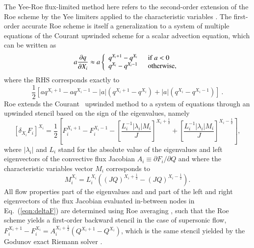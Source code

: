 The Yee-Roe flux-limited method here refers to the second-order extension
of the Roe scheme \cite{jcp:1981:roe} by
the Yee limiters applied to the characteristic variables \cite{jcp:1990:yee}.
The first-order accurate Roe scheme is itself a generalization to
a system of multiple equations of
the Courant upwinded scheme \cite{misc:1952:courant} for a scalar advection equation,
which can be written as
%
\begin{equation}
  a\frac{\partial q}{\partial X_i} \approx
  a \left\{
    \begin{array}{ll} q^{X_i+1}-q^{X_i} & ~~{\rm if}~a<0 \\
                      q^{X_i}-q^{X_i-1} & ~~{\rm otherwise,}\end{array}
\right.
\end{equation}
%
where the RHS corresponds exactly to
%
\begin{equation}
  \frac{1}{2} \left[
                         a q^{X_i+1}- a q^{X_i-1}
                       - |a| \left( q^{X_i+1} - q^{X_i} \right)
                       + |a| \left( q^{X_i} - q^{X_i-1} \right) \right]~.
\end{equation}
%
Roe extends the Courant \etal\ upwinded method to a system of equations through
an upwinded stencil based on the sign of the eigenvalues, namely
%
\begin{equation}
\left[ \delta_{X_i} F_i \right]^{X_i}=\frac{1}{2}\left[ F_{i}^{X_i+1}-F_{i}^{X_i-1}
          - \left[ \frac{L^{-1}_i |\lambda_i| M_i}{J} \right]^{X_i+\frac{1}{2}}
          + \left[ \frac{L^{-1}_i |\lambda_i| M_i}{J} \right]^{X_i-\frac{1}{2}} \right],
\end{equation}
%
where $|\lambda_i|$ and $L_i$ stand for the absolute value of the eigenvalues and
left eigenvectors of the
convective flux Jacobian  $A_i\equiv \partial F_i / \partial Q$
and where the characteristic variables vector $M_i$ corresponds to
%
\begin{equation}
 M_{i}^{X_i}=L_i^{X_i}\left( \left( JQ \right)^{X_i+\frac{1}{2}}
                      - \left(JQ\right)^{X_i-\frac{1}{2}} \right).
\end{equation}
%
All flow properties part
of the eigenvalues and and part of the left and right eigenvectors of the flux Jacobian
evaluated in-between nodes in Eq.~(\ref{eqn:deltaF}) are determined using Roe averaging
\cite{jcp:1981:roe},
such that the Roe scheme yields a first-order backward stencil in the case of
supersonic flow,
\ie\ $F_i^{X_i+1}-F_i^{X_i}=A_i^{X_i+\frac{1}{2}}(Q^{X_i+1}-Q^{X_i})$, which is
the same stencil yielded by the Godunov exact Riemann solver \cite{misc:1959:godunov}.
